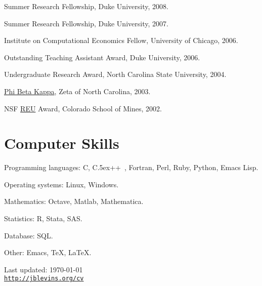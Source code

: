 \documentclass[letterpaper]{article}
\renewenvironment{itemize}{
  \begin{list}{}
    { \setlength{\itemsep}{5pt}
      \setlength{\parsep}{0pt}
      \setlength{\topsep}{0pt}
      \setlength{\leftmargin}{0em} } }{
  \end{list}}
\def\Cplusplus{C{\raise.5ex\hbox{\footnotesize ++ }}}
\begin{document}
\begin{itemize}
\item Summer Research Fellowship, Duke University, 2008.
\item Summer Research Fellowship, Duke University, 2007.
\item Institute on Computational Economics Fellow, University of Chicago, 2006.
\item Outstanding Teaching Assistant Award, Duke University, 2006.
\item Undergraduate Research Award, North Carolina State University, 2004.
\item \href{http://www.pbk.org/}{Phi Beta Kappa}, Zeta of North Carolina, 2003.
\item NSF \href{http://www.nsf.gov/crssprgm/reu/}{REU} Award,
  Colorado School of Mines, 2002.
\end{itemize}

\section*{Computer Skills}

\begin{itemize}
\item Programming languages: C, \Cplusplus, Fortran, Perl, Ruby, Python,
  Emacs Lisp.
\item Operating systems: Linux, Windows.
\item Mathematics: Octave, Matlab, Mathematica.
\item Statistics: R, Stata, SAS.
\item Database: SQL.
\item Other: Emacs, \TeX, \LaTeX.
\end{itemize}

\bigskip

\begin{center}
\begin{footnotesize}
Last updated: \today \\
\href{http://jblevins.org/cv}{\tt http://jblevins.org/cv}
\end{footnotesize}
\end{center}
\end{document}
